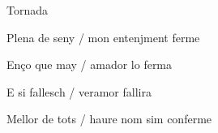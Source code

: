 \documentclass[12pt]{article}
\begin{document}
\begin{estrofaExtra}%




\begin{tornada}

Tornada

\end{tornada}


\end{estrofaExtra}


\begin{estrofa}

 Plena de seny / mon entenjment ferme

 En\c{c}o que may / amador lo ferma

 E si fallesch / veramor fallira

 Mellor de tots / haure nom sim conferme

\end{estrofa}
\end{document}
